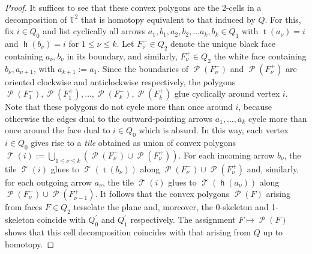 \documentclass[11pt,a4paper]{amsart}
\numberwithin{equation}{section}
\theoremstyle{definition}
\theoremstyle{remark}
\newcommand{\head}{\operatorname{\mathsf{h}}}
\newcommand{\tail}{\operatorname{\mathsf{t}}}
\newcommand{\tile}{\operatorname{\mathcal{T}}}
\newcommand{\Tile}{\operatorname{\mathcal{P}}}
\begin{document}
\begin{proof}
It suffices to see that these convex polygons are the 2-cells in a decomposition of $\mathbb{T}^2$ that is homotopy equivalent to that induced by $Q$.  For this, fix $i\in Q_0$ and list cyclically all arrows $a_1,b_1,a_2, b_2, \dots a_k, b_k\in Q_1$ with $\tail(a_\nu)=i$ and $\head(b_\nu)=i$ for $1\leq \nu\leq k$. Let $F^-_\nu\in Q_2$ denote the unique black face containing $a_\nu, b_\nu$ in its boundary, and similarly, $F^+_\nu\in Q_2$ the white face containing $b_\nu, a_{\nu+1}$, with $a_{k+1}:=a_1$. Since the boundaries of $\Tile(F^-_\nu)$ and $\Tile(F^+_\nu)$ are oriented clockwise and anticlockwise respectively, the polygons $\Tile(F^-_1), \Tile(F^+_1), \dots, \Tile(F^-_k), \Tile(F^+_k)$ glue cyclically around vertex $i$. Note that these polygons do not cycle more than once around $i$, because otherwise the edges dual to the outward-pointing arrows $a_1,\dots, a_k$ cycle more than once around the face dual to $i\in Q_0$ which is absurd. In this way, each vertex $i\in Q_0$ gives rise to a \emph{tile} obtained as union of convex polygons $\tile(i):=\bigcup_{1\leq\nu\leq k} (\Tile(F^-_\nu)\cup \Tile(F^+_\nu))$. For each incoming arrow $b_\nu$, the tile $\tile(i)$ glues to $\tile(\tail(b_\nu))$ along $\Tile(F_\nu^-)\cup\Tile(F^+_\nu)$ and, similarly,  for each outgoing arrow $a_\nu$, the tile $\tile(i)$ glues to $\tile(\head(a_\nu))$ along $\Tile(F_\nu^-)\cup\Tile(F^+_{\nu-1})$. It follows that the convex polygons $\Tile(F)$ arising from faces $F\in Q_2$ tesselate the plane and, moreover, the 0-skeleton and 1-skeleton coincide with $Q_0^\prime$ and $Q_1^\prime$ respectively. The assignment $F\mapsto \Tile(F)$ shows that this cell decomposition coincides with that arising from $Q$ up to homotopy.
    \end{proof}
   
\end{document}
